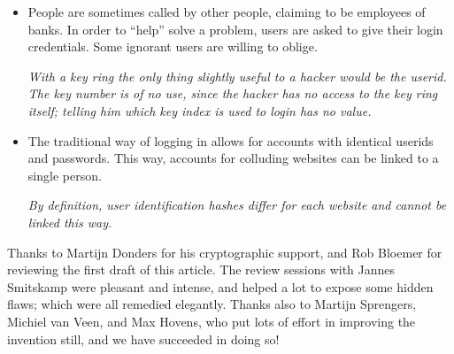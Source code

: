\begin{itemize}
{since the wrong hash is sent,
and no keys or login values are sent over the line.}
\item People are sometimes called by other people,
claiming to be employees of banks.
In order to ``help'' solve a problem,
users are asked to give their login credentials.
Some ignorant users are willing to oblige.
\par
\emph{With a key ring the only thing slightly useful to a hacker would be the userid.
The key number is of no use,
since the hacker has no access to the key ring itself;
telling him which key index is used to login has no value.}
\item The traditional way of logging in allows for accounts with identical userids and passwords.
This way,
accounts for colluding websites can be linked to a single person.
\par
\emph{By definition, user identification hashes differ for each website and cannot be linked this way.}
\end{itemize}

Thanks to Martijn Donders for his cryptographic support,
and Rob Bloemer for reviewing the first draft of this article.
The review sessions with Jannes Smitskamp were pleasant and intense,
and helped a lot to expose some hidden flaws;
which were all remedied elegantly.
Thanks also to Martijn Sprengers, Michiel van Veen, and Max Hovens,
who put lots of effort in improving the invention still,
and we have succeeded in doing so!
